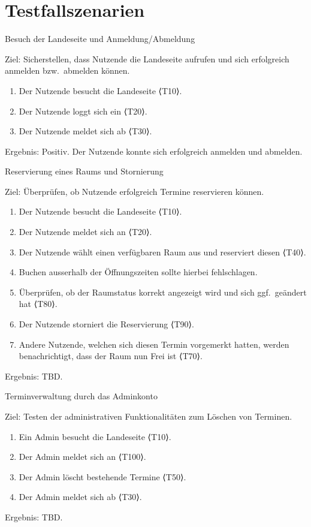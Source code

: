\section{Testfallszenarien}\label{sec:testfallszenarien}
\begin{scenario}{10}{Besuch der Landeseite und Anmeldung/Abmeldung}
    \item[Ziel:] Sicherstellen, dass Nutzende die Landeseite aufrufen und sich erfolgreich anmelden bzw.\ abmelden können.
    \begin{enumerate}
        \item Der Nutzende besucht die Landeseite ⟨T10⟩.
        \item Der Nutzende loggt sich ein ⟨T20⟩.
        \item Der Nutzende meldet sich ab ⟨T30⟩.
    \end{enumerate}
    \item[Ergebnis:] Positiv.
    Der Nutzende konnte sich erfolgreich anmelden und abmelden.
\end{scenario}

\begin{scenario}{20}{Reservierung eines Raums und Stornierung}
    \item[Ziel:] Überprüfen, ob Nutzende erfolgreich Termine reservieren können.
    \begin{enumerate}
        \item Der Nutzende besucht die Landeseite ⟨T10⟩.
        \item Der Nutzende meldet sich an ⟨T20⟩.
        \item Der Nutzende wählt einen verfügbaren Raum aus und reserviert diesen ⟨T40⟩.
        \item Buchen ausserhalb der Öffnungszeiten sollte hierbei fehlschlagen.
        \item Überprüfen, ob der Raumstatus korrekt angezeigt wird und sich ggf.\ geändert hat ⟨T80⟩.
        \item Der Nutzende storniert die Reservierung ⟨T90⟩.
        \item Andere Nutzende, welchen sich diesen Termin vorgemerkt hatten, werden benachrichtigt, dass der Raum nun Frei ist ⟨T70⟩.
    \end{enumerate}
    \item[Ergebnis:] TBD.
\end{scenario}

\begin{scenario}{30}{Terminverwaltung durch das Adminkonto}
    \item[Ziel:] Testen der administrativen Funktionalitäten zum Löschen von Terminen.
    \begin{enumerate}
        \item Ein Admin besucht die Landeseite ⟨T10⟩.
        \item Der Admin meldet sich an ⟨T100⟩.
        \item Der Admin löscht bestehende Termine ⟨T50⟩.
        \item Der Admin meldet sich ab ⟨T30⟩.
    \end{enumerate}
    \item[Ergebnis:] TBD.
\end{scenario}

